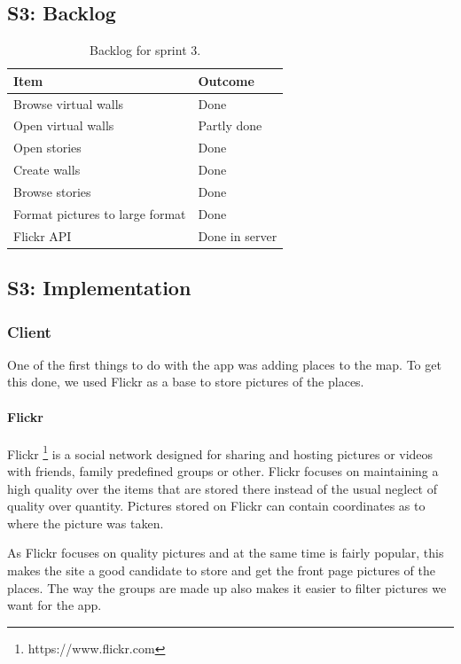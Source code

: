 \documentclass[11pt]{book}
\begin{document}
\subsection{S3: Backlog}
\begin{table}[H]
    \centering
    \begin{tabular}{| l | l |} \hline
        Item                                                                & Outcome         \\ \hline
        Browse virtual walls & Done\\ \hline
        Open virtual walls & Partly done\\ \hline
        Open stories & Done\\ \hline
        Create walls & Done\\ \hline
        Browse stories & Done\\ \hline
        Format pictures to large format & Done\\ \hline
        Flickr API & Done in server\\ \hline
    \end{tabular}
    \caption{Backlog for sprint 3.}
    \label{tab:phase_sprint3_backlog}
\end{table}

\subsection{S3: Implementation}

\subsubsection{Client}
One of the first things to do with the app was adding places to the map. To get this done, we used Flickr as a base to store pictures of the places.

\paragraph{Flickr}
Flickr \footnote{https://www.flickr.com} is a social network designed for sharing and hosting pictures or videos with friends, family predefined groups or other. Flickr focuses on maintaining a high quality over the items that are stored there instead of the usual neglect of quality over quantity. Pictures stored on Flickr can contain coordinates as to where the picture was taken. 

As Flickr focuses on quality pictures and at the same time is fairly popular, this makes the site a good candidate to store and get the front page pictures of the places. The way the groups are made up also makes it easier to filter pictures we want for the app. 
\end{document}
